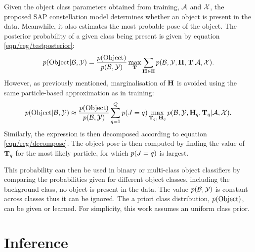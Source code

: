 Given the object class parameters obtained from training, $\mathcal{A}$ and $\mathcal{X}$, the proposed SAP constellation model determines whether an object is present in the data. Meanwhile, it also estimates the most probable pose of the object. 
The posterior probability of a given class being present is given by equation \ref{eqn/reg/testposterior}: 
\begin{equation}
	p(\mathrm{Object}|\mathcal{B},\mathcal{Y}) = \displaystyle\frac{p(\mathrm{Object})}{p(\mathcal{B},\mathcal{Y})}\max_{\mathbf{T}}\sum_{\mathbf{H} \in \mathbb{H}}p(\mathcal{B},\mathcal{Y},\mathbf{H},\mathbf{T}|\mathcal{A},\mathcal{X}).
	\label{eqn/reg/testposterior}
\end{equation}
However, as previously mentioned, marginalisation of $\mathbf{H}$ is avoided using the same particle-based approximation as in training:
\begin{equation}
	p(\mathrm{Object}|\mathcal{B},\mathcal{Y}) \approx \displaystyle\frac{p(\mathrm{Object})}{p(\mathcal{B},\mathcal{Y})} \sum_{q=1}^Q p({J} = q)
	\max_{\mathbf{T}_q,\,\mathbf{H}_q} p(\mathcal{B},\mathcal{Y},\mathbf{H}_q,\mathbf{T}_q|\mathcal{A},\mathcal{X}).
	\label{eqn/reg/testobjective}
\end{equation}
Similarly, the expression is then decomposed according to equation \ref{eqn/reg/decompose}.
The object pose is then computed by finding the value of $\mathbf{T}_q$ for the most likely particle, \ie for which $p({J} = q)$ is largest.

This probability can then be used in binary or multi-class object classifiers by comparing the probabilities given for different object classes, including the background class, \ie no object is present in the data. The value $p(\mathcal{B},\mathcal{Y})$ is constant across classes thus it can be ignored. The a priori class distribution, $p(\mathrm{Object})$, can be given or learned. For simplicity, this work assumes an uniform class prior. 

\section{Inference}
\label{sec/reg/optimisation}

